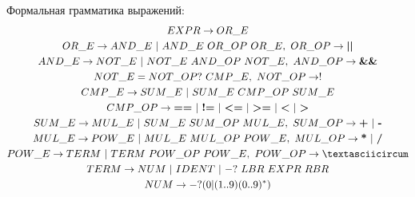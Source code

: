 \documentclass[14pt]{extarticle}
\begin{document}
Формальная грамматика выражений:
\begin{gather*}
    EXPR \to OR\_E\\
    OR\_E \to AND\_E\ |\ AND\_E\ OR\_OP\ OR\_E,\ OR\_OP \to \textbf{||}\\
    AND\_E \to NOT\_E\ |\ NOT\_E\ AND\_OP\ NOT\_E,\ AND\_OP \to \textbf{\&\&}\\
    NOT\_E = NOT\_OP ?\ CMP\_E,\ NOT\_OP \to !\\
    CMP\_E \to SUM\_E\ |\ SUM\_E\ CMP\_OP\ SUM\_E\\
    CMP\_OP \to \textbf{==}\ |\ \textbf{!=}\ |\ \textbf{<=}\ |\ \textbf{>=}\ |\
    \textbf{<}\ |\ \textbf{>}\\
    SUM\_E \to MUL\_E\ |\ SUM\_E\ SUM\_OP\ MUL\_E,\ SUM\_OP \to \textbf{+}\ |\ \textbf{-}\\
    MUL\_E \to POW\_E\ |\ MUL\_E\ MUL\_OP\ POW\_E,\ MUL\_OP \to \textbf{*}\ |\ \textbf{/}\\
    POW\_E \to TERM\ |\ TERM\ POW\_OP\ POW\_E,\ POW\_OP \to \textasciicircum\\
    TERM \to NUM\ |\ IDENT\ |\ -?\ LBR\ EXPR\ RBR\\
    NUM \to -?(0 | (1..9) (0..9)^*)
\end{gather*}
\end{document}
